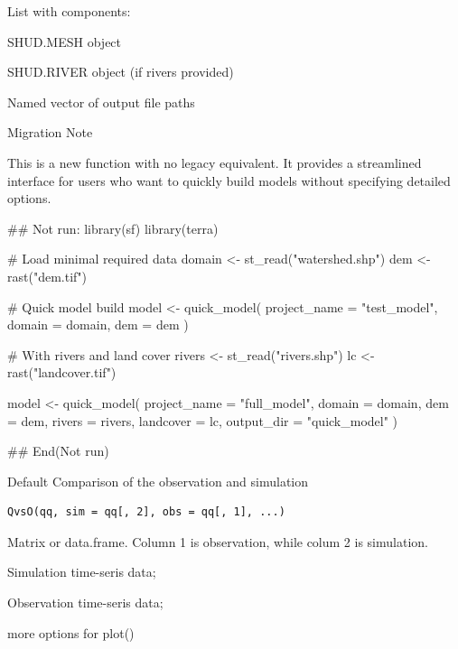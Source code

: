 \documentclass[a4paper]{book}
\begin{document}
%
\begin{Value}
List with components:
\begin{ldescription}
\item[\code{mesh}] SHUD.MESH object
\item[\code{river}] SHUD.RIVER object (if rivers provided)
\item[\code{files}] Named vector of output file paths
\end{ldescription}
\end{Value}
%
\begin{Section}{Migration Note}

This is a new function with no legacy equivalent. It provides a streamlined
interface for users who want to quickly build models without specifying
detailed options.
\end{Section}
%
\begin{Examples}
\begin{ExampleCode}
## Not run: 
library(sf)
library(terra)

# Load minimal required data
domain <- st_read("watershed.shp")
dem <- rast("dem.tif")

# Quick model build
model <- quick_model(
  project_name = "test_model",
  domain = domain,
  dem = dem
)

# With rivers and land cover
rivers <- st_read("rivers.shp")
lc <- rast("landcover.tif")

model <- quick_model(
  project_name = "full_model",
  domain = domain,
  dem = dem,
  rivers = rivers,
  landcover = lc,
  output_dir = "quick_model"
)

## End(Not run)
\end{ExampleCode}
\end{Examples}
%
\begin{Description}\relax
Default Comparison of the observation and simulation
\end{Description}
%
\begin{Usage}
\begin{verbatim}
QvsO(qq, sim = qq[, 2], obs = qq[, 1], ...)
\end{verbatim}
\end{Usage}
%
\begin{Arguments}
\begin{ldescription}
\item[\code{qq}] Matrix or data.frame. Column 1 is observation, while colum 2 is simulation.

\item[\code{sim}] Simulation time-seris data;

\item[\code{obs}] Observation time-seris data;

\item[\code{...}] more options for plot()
\end{ldescription}
\end{Arguments}
\end{document}
